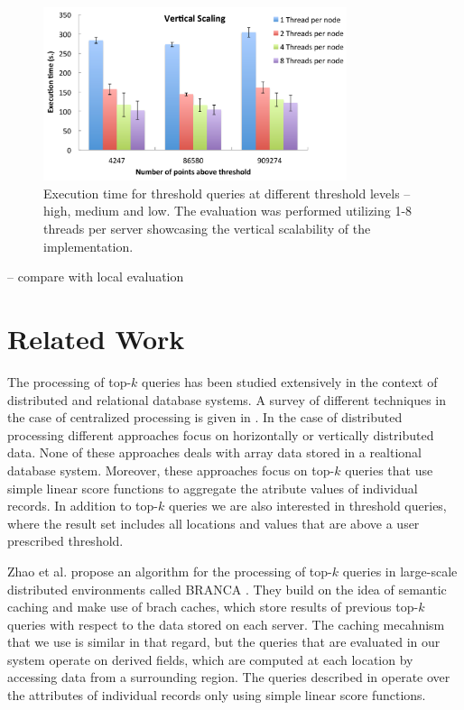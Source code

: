 \documentclass{sig-alternate}
\begin{document}
\begin{figure}
\centering
\includegraphics[width=3.5in]{Figures/scaleup.pdf}
\caption{Execution time for threshold queries at different threshold levels -- high, medium and low. The evaluation was performed utilizing 1-8
threads per server showcasing the vertical scalability of the implementation.}
\label{fig:scaleup}
\end{figure}

-- compare with local evaluation

\section{Related Work}
The processing of top-$k$ queries has been studied extensively in the context of distributed and relational database systems. A survey of different techniques
in the case of centralized processing is given in \cite{Ilyas}. In the case of distributed processing different approaches focus on horizontally 
\cite{Balke, Vlachou} or vertically \cite{Cao, Chaudhuri, Guntzer, Marian, Michel} distributed data. None of these approaches deals with array data stored in
a realtional database system. Moreover, these approaches focus on top-$k$ queries that use simple linear score functions to aggregate the atribute values of
individual records. In addition to top-$k$ queries we are also interested in threshold queries, where the result set includes all locations and values that are
above a user prescribed threshold. 

Zhao et al. propose an algorithm for the processing of top-$k$ queries in large-scale distributed environments called BRANCA \cite{Zhao}. They build on the 
idea of semantic caching \cite{Ren} and make use of brach caches, which store results of previous top-$k$ queries with respect to the data stored on each server.
The caching mecahnism that we use is similar in that regard, but the queries that are evaluated in our system operate on derived fields, which are computed
at each location by accessing data from a surrounding region. The queries described in \cite{Zhao} operate over the attributes of individual records only using
simple linear score functions.
\end{document}

